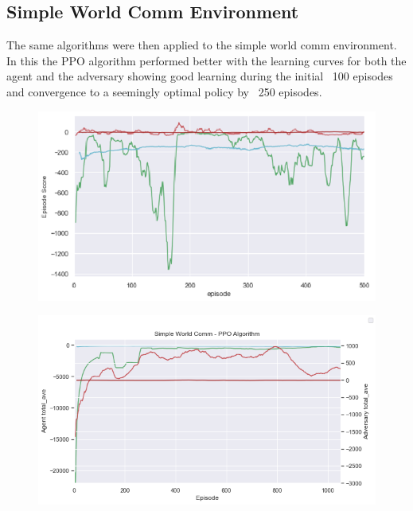 \documentclass{article}
\begin{document}
\subsection{Simple World Comm Environment}

The same algorithms were then applied to the simple world comm environment.
In this the PPO algorithm performed better with the learning curves for both the agent and the adversary showing good learning during the initial ~100 episodes and convergence to a seemingly optimal policy by ~250 episodes.




\begin{figure}[!ht]
  \centering
  \begin{minipage}{.5\linewidth} 
    \centering
    \includegraphics[width=\linewidth]{simple_world_comm_DQN.png}
    \label{fig:DQNCOMM}
  \end{minipage}%
  \begin{minipage}{.5\linewidth}
    \centering
    \includegraphics[width=\linewidth]{simple_world_comm_PPO.png}

\end{minipage}
\end{figure}
\end{document}
